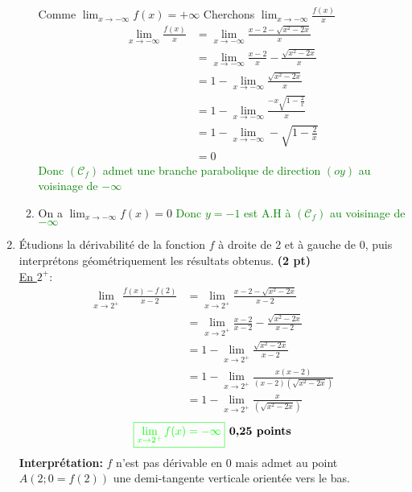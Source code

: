 \documentclass[12pt,a4paper]{article}
\begin{document}
\begin{enumerate}
\begin{enumerate}
Comme $\lim_{x \to -\infty} f(x) = +\infty$ Cherchons $\lim_{x \to -\infty} \frac{f(x)}{x}$
\begin{align*}
\lim_{x \to -\infty} \frac{f(x)}{x} &= \lim_{x \to -\infty}\frac{x - 2 - \sqrt{x^2 - 2x}}{x}\\
																		&=\lim_{x \to -\infty}\frac{x - 2}{x}-\frac{ \sqrt{x^2 - 2x}}{x}\\
																		&=1-\lim_{x \to -\infty}\frac{ \sqrt{x^2 - 2x}}{x}\\
																		&=1-\lim_{x \to -\infty}\frac{ -x\sqrt{1 - \frac{2}{x}}}{x}\\
																		&=1-\lim_{x \to -\infty}-\sqrt{1 - \frac{2}{x}}\\
																		&=0
\end{align*}
\textcolor{green}{Donc $(\mathcal{C}_{f}) $ admet une branche parabolique de direction $(oy)$ au voisinage de $-\infty$}
\item On a $\lim_{x \to -\infty} f(x)=0$
\textcolor{green}{Donc $y=-1$  est A.H à $(\mathcal{C}_{f}) $ au voisinage de $-\infty$}
\end{enumerate}
\item Étudions la dérivabilité de la fonction \( f \) à droite de 2 et à gauche de 0, puis interprétons géométriquement les résultats obtenus. \hspace{1cm} \textbf{(2 pt)}\\
\underline{En $2^{+}:$}
\begin{align*}
\lim_{x \to 2^{+}} \frac{f(x)-f(2)}{x-2} &= \lim_{x \to 2^{+}}\frac{x - 2 - \sqrt{x^2 - 2x}}{x-2}\\
												&=\lim_{x \to 2^{+}} \frac{x - 2 }{x - 2 }-\frac{\sqrt{x^2 - 2x}}{x - 2 }\\
												&=1-\lim_{x \to 2^{+}}\frac{\sqrt{x^2 - 2x}}{x - 2 }\\
												&=1-\lim_{x \to 2^{+}}\frac{x(x - 2)}{ (x - 2)(\sqrt{x^2 - 2x}) }\\
												&=1-\lim_{x \to 2^{+}}\frac{x}{(\sqrt{x^2 - 2x}) }
\end{align*}
\[
\textcolor{green}{\boxed{ \lim_{x \to 2^{+}} f(x) =  -\infty }} \textbf{ 0,25 points}
\]
\textbf{Interprétation:} $f$ n'est pas dérivable en 0 mais admet au point $A(2;0=f(2))$ une demi-tangente verticale orientée vers le bas.


\end{enumerate}
\end{document}
